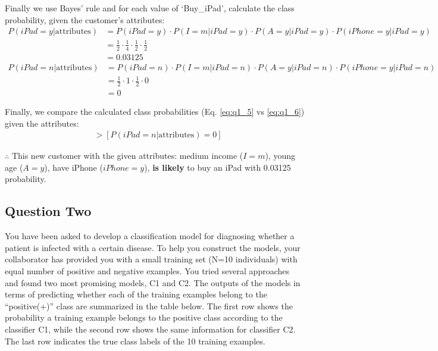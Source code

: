 Finally we use Bayes' rule and for each value of `Buy\_iPad', calculate the class probability, given the customer's attributes:
\begin{align}
    P(iPad = y|\text{attributes}) &= P(iPad = y)\cdot P(I=m | iPad = y) \cdot P(A=y | iPad = y) \cdot P(iPhone=y | iPad = y) \label{eq:q1_5} \nonumber \\
    &= \frac{1}{2} \cdot \frac{1}{4} \cdot \frac{1}{2} \cdot \frac{1}{2} \nonumber \\
    &= 0.03125
\end{align}
\begin{align}
    P(iPad = n|\text{attributes}) &= P(iPad = n)\cdot P(I=m | iPad = n) \cdot P(A=y | iPad = n) \cdot P(iPhone=y | iPad = n) \label{eq:q1_6} \nonumber \\
    &= \frac{1}{2} \cdot 1 \cdot \frac{1}{2} \cdot 0 \nonumber \\
    &= 0
\end{align}

Finally, we compare the calculated class probabilities (Eq. \ref{eq:q1_5} vs \ref{eq:q1_6}) given the attributes:
\begin{align}
    [P(iPad = n|\text{attributes}) = 0.03125] &> [P(iPad = n|\text{attributes}) = 0]
\end{align}

$\therefore$ This new customer with the given attributes: medium income ($I=m$), young age ($A=y$), have iPhone ($iPhone=y$), \textbf{is likely} to buy an iPad with 0.03125 probability.

\subsection{Question Two}
You have been asked to develop a classification model for diagnosing whether a patient is infected with a certain disease. To help you construct the models, your collaborator has provided you with a small training set (N=10 individuals) with equal number of positive and negative examples. You tried several approaches and found two most promising models, C1 and C2. The outputs of the models in terms of predicting whether each of the training examples belong to the “positive(+)” class are summarized in the table below. The first row shows the probability a training example belongs to the positive class according to the classifier C1, while the second row shows the same information for classifier C2. The last row indicates the true class labels of the 10 training examples.

